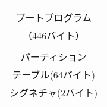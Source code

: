 \documentclass[border=1mm]{standalone}
\begin{document}
\begin{tabular}{|c|}\hline
                      \\
  ブートプログラム    \\
  （446バイト）       \\
                      \\\hline
  パーティション      \\
  テーブル(64バイト)  \\\hline
  シグネチャ(2バイト) \\\hline
\end{tabular}
\end{document}
